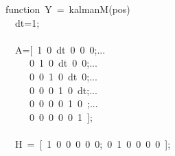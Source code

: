 \documentclass{article}\usepackage[]{graphicx}\usepackage[]{color}
\makeatletter
\newcommand{\hlnum}[1]{\textcolor[rgb]{0.863,0.196,0.184}{#1}}%
\newcommand{\hlopt}[1]{\textcolor[rgb]{0.576,0.631,0.631}{#1}}%
\newcommand{\hlstd}[1]{\textcolor[rgb]{0.514,0.58,0.588}{#1}}%
\newcommand{\hlkwa}[1]{\textcolor[rgb]{0.796,0.294,0.086}{#1}}%
\newenvironment{kframe}{%
 \def\at@end@of@kframe{}%
 \ifinner\ifhmode%
  \def\at@end@of@kframe{\end{minipage}}%
  \begin{minipage}{\columnwidth}%
 \fi\fi%
 \def\FrameCommand##1{\hskip\@totalleftmargin \hskip-\fboxsep
 \colorbox{shadecolor}{##1}\hskip-\fboxsep
     \hskip-\linewidth \hskip-\@totalleftmargin \hskip\columnwidth}%
 \MakeFramed {\advance\hsize-\width
   \@totalleftmargin\z@ \linewidth\hsize
   \@setminipage}}%
 {\par\unskip\endMakeFramed%
 \at@end@of@kframe}
\newenvironment{knitrout}{}{} %
\makeatother
\begin{document}
\begin{knitrout}
\color{fgcolor}\begin{kframe}
\noindent
\ttfamily
\hlstd{}\hlkwa{function\ }\hlstd{Y\ }\hlopt{=\ }\hlstd{kalmanM}\hlopt{(}\hlstd{pos}\hlopt{)}\hspace*{\fill}\\
\hlstd{}\hlstd{\ \ }\hlstd{dt}\hlopt{=}\hlstd{}\hlnum{1}\hlstd{}\hlopt{;}\hspace*{\fill}\\
\hlstd{}\hlstd{\ \ }\hlstd{}\hspace*{\fill}\\
\hlstd{}\hlstd{\ \ }\hlstd{A}\hlopt{={[}\ }\hlstd{}\hlnum{1\ 0\ }\hlstd{dt\ }\hlnum{0\ 0\ 0}\hlstd{}\hlopt{;}\hlstd{...}\hlstd{\ \ \ \ \ }\hlstd{}\hlslc{\%\ {[}x}\hlstd{\ \ }\hlslc{{]}}\hspace*{\fill}\\
\hlstd{}\hlstd{\ \ \ \ \ }\hlstd{}\hlnum{0\ 1\ 0\ }\hlstd{dt\ }\hlnum{0\ 0}\hlstd{}\hlopt{;}\hlstd{...}\hlstd{\ \ \ \ \ }\hlstd{}\hlslc{\%\ {[}y}\hlstd{\ \ }\hlslc{{]}}\hspace*{\fill}\\
\hlstd{}\hlstd{\ \ \ \ \ }\hlstd{}\hlnum{0\ 0\ 1\ 0\ }\hlstd{dt\ }\hlnum{0}\hlstd{}\hlopt{;}\hlstd{...}\hlstd{\ \ \ \ \ }\hlstd{}\hlslc{\%\ {[}Vx{]}}\hspace*{\fill}\\
\hlstd{}\hlstd{\ \ \ \ \ }\hlstd{}\hlnum{0\ 0\ 0\ 1\ 0\ }\hlstd{dt}\hlopt{;}\hlstd{...}\hlstd{\ \ \ \ \ }\hlstd{}\hlslc{\%\ {[}Vy{]}}\hspace*{\fill}\\
\hlstd{}\hlstd{\ \ \ \ \ }\hlstd{}\hlnum{0\ 0\ 0\ 0\ 1\ 0\ }\hlstd{}\hlopt{;}\hlstd{...}\hlstd{\ \ \ \ \ }\hlstd{}\hlslc{\%\ {[}Ax{]}}\hspace*{\fill}\\
\hlstd{}\hlstd{\ \ \ \ \ }\hlstd{}\hlnum{0\ 0\ 0\ 0\ 0\ 1\ }\hlstd{}\hlopt{{]};}\hlstd{\ \ \ \ \ \ \ }\hlopt{}\hlstd{}\hlslc{\%\ {[}Ay{]}}\hspace*{\fill}\\
\hlstd{}\hlstd{\ \ }\hlstd{}\hspace*{\fill}\\
\hlstd{}\hlstd{\ \ }\hlstd{H\ }\hlopt{=\ {[}\ }\hlstd{}\hlnum{1\ 0\ 0\ 0\ 0\ 0}\hlstd{}\hlopt{;\ }\hlstd{}\hlnum{0\ 1\ 0\ 0\ 0\ 0\ }\hlstd{}\hlopt{{]};}\hspace*{\fill}\\

\end{kframe}
\end{knitrout}
\end{document}
